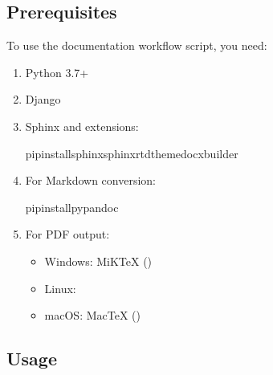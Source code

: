 \documentclass[letterpaper,10pt,english]{sphinxmanual}
\begin{document}
\subsection{Prerequisites}
\label{\detokenize{documentation_workflow:prerequisites}}
\sphinxAtStartPar
To use the documentation workflow script, you need:
\begin{enumerate}
%
\item {} 
\sphinxAtStartPar
Python 3.7+

\item {} 
\sphinxAtStartPar
Django

\item {} 
\sphinxAtStartPar
Sphinx and extensions:

\begin{sphinxVerbatim}[commandchars=\\\{\}]
pipinstallsphinxsphinx\PYGZhy{}rtd\PYGZhy{}themedocxbuilder
\end{sphinxVerbatim}

\item {} 
\sphinxAtStartPar
For Markdown conversion:

\begin{sphinxVerbatim}[commandchars=\\\{\}]
pipinstallpypandoc
\end{sphinxVerbatim}

\item {} 
\sphinxAtStartPar
For PDF output:
\begin{itemize}
\item {} 
\sphinxAtStartPar
Windows: MiKTeX ()

\item {} 
\sphinxAtStartPar
Linux: 

\item {} 
\sphinxAtStartPar
macOS: MacTeX ()

\end{itemize}

\end{enumerate}


\subsection{Usage}
\label{\detokenize{documentation_workflow:usage}}
\end{document}
